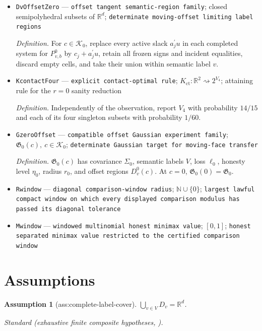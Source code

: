 \documentclass{article}
\newtheorem{assumption}{Assumption}
\begin{document}
\begin{itemize}
  \item \texttt{DvOffsetZero} --- \texttt{offset tangent semantic-\allowbreak{}region family}; closed semipolyhedral subsets of \(\mathbb R^d\); \texttt{determinate moving-\allowbreak{}offset limiting label regions}
  \par\smallskip\noindent\emph{Definition.} For \(c\in\mathcal K_0\), replace every active slack \(a_j^{\prime}u\) in each completed system for \(P_{v,b}^0\) by \(c_j+a_j^{\prime}u\), retain all frozen signs and incident equalities, discard empty cells, and take their union within semantic label \(v\).
  \item \texttt{KcontactFour} --- \texttt{explicit contact-\allowbreak{}optimal rule}; \(K_{\mathrm{ct}}:\mathbb R^2\rightsquigarrow2^{V_4}\); attaining rule for the \(r=0\) sanity reduction
  \par\smallskip\noindent\emph{Definition.} Independently of the observation, report \(V_4\) with probability \(14/15\) and each of its four singleton subsets with probability \(1/60\).
  \item \texttt{GzeroOffset} --- \texttt{compatible offset Gaussian experiment family}; \(\mathfrak G_0(c),\ c\in\mathcal K_0\); \texttt{determinate Gaussian target for moving-\allowbreak{}face transfer}
  \par\smallskip\noindent\emph{Definition.} \(\mathfrak G_0(c)\) has covariance \(\Sigma_0\), semantic labels \(V\), loss \(\ell_0\), honesty level \(\eta_0\), radius \(r_0\), and offset regions \(D_v^0(c)\). At \(c=0\), \(\mathfrak G_0(0)=\mathfrak G_0\).
  \item \texttt{Rwindow} --- \texttt{diagonal comparison-\allowbreak{}window radius}; \(\mathbb N\cup\{0\}\); \texttt{largest lawful compact window on which every displayed comparison modulus has passed its diagonal tolerance}
  \item \texttt{Mwindow} --- \texttt{windowed multinomial honest minimax value}; \([0,1]\); \texttt{honest separated minimax value restricted to the certified comparison window}
\end{itemize}

\section{Assumptions}

\begin{assumption}[ass:complete-label-cover]\label{ass:complete-label-cover}
\(\bigcup_{v\in V}D_v=\mathbb R^d\).
\par\smallskip\noindent\emph{Standard} (exhaustive finite composite hypotheses, \cite{GoldenshlugerJuditskyNemirovski2015}).
\end{assumption}
\end{document}
